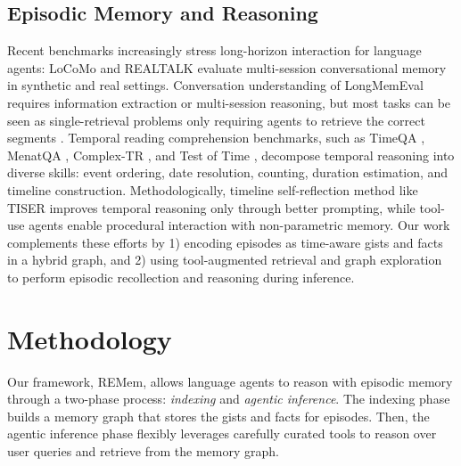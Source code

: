 \documentclass{article} %
\newcommand{\ours}{REMem\xspace}
\begin{document}
\subsection{Episodic Memory and Reasoning}

Recent benchmarks increasingly stress long-horizon interaction for language agents: LoCoMo \citep{locomo} and REALTALK \citep{realtalk} evaluate multi-session conversational memory in synthetic and real settings.
Conversation understanding of LongMemEval \citep{longmemeval} requires information extraction or multi-session reasoning, but most tasks can be seen as single-retrieval problems only requiring agents to retrieve the correct segments \citep{memoryagentbench}.
Temporal reading comprehension benchmarks, such as TimeQA \citep{timeqa}, MenatQA \citep{menatqa}, Complex-TR \citep{complextr}, and Test of Time \citep{tot}, decompose temporal reasoning into diverse skills: event ordering, date resolution, counting, duration estimation, and timeline construction. 
Methodologically, timeline self-reflection method like TISER \citep{tiser} improves temporal reasoning only through better prompting, while tool-use agents \citep{tremu,tempagent} enable procedural interaction with non-parametric memory. 
Our work complements these efforts by 1) encoding episodes as time-aware gists and facts in a hybrid graph, and 2) using tool-augmented retrieval and graph exploration to perform episodic recollection and reasoning during inference.


\section{Methodology}


Our framework, \ours, allows language agents to reason with episodic memory through a two-phase process: \textit{indexing} and \textit{agentic inference}.
The indexing phase builds a memory graph that stores the gists and facts for episodes.
Then, the agentic inference phase flexibly leverages carefully curated tools to reason over user queries and retrieve from the memory graph.
\end{document}
